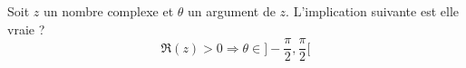 Soit $z$ un nombre complexe et $\theta$ un argument de $z$. L'implication suivante est elle vraie ?
\begin{displaymath}
 \Re (z) > 0 \Rightarrow \theta \in ]-\frac{\pi}{2},\frac{\pi}{2}[
\end{displaymath}
\bigskip
